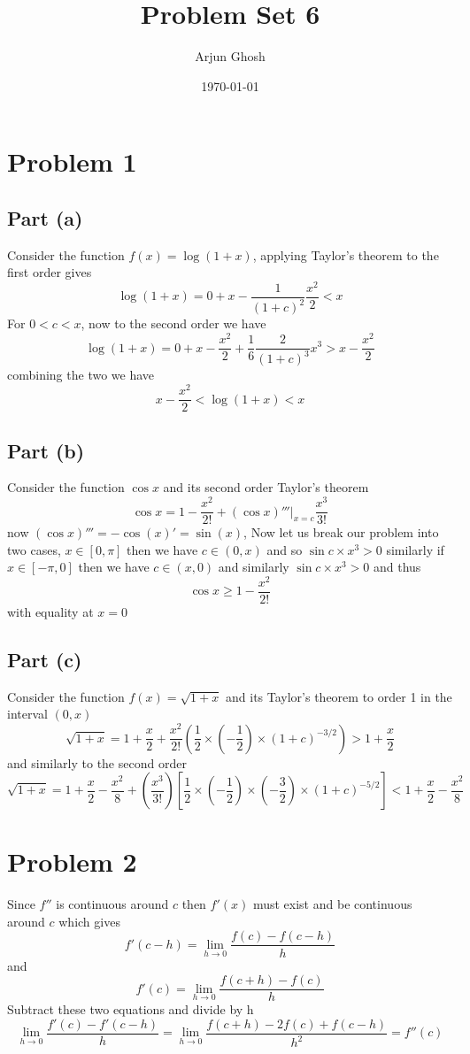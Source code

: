 \documentclass[12pt]{article}
\title{Problem Set 6}
\author{Arjun Ghosh}
\date{\today}
\begin{document}
\maketitle
\section*{Problem 1}
\subsection{Part (a)}
Consider the function $f(x)= \log(1+x)$, applying Taylor's theorem to the first order gives
$$
\log(1+x) = 0 + x   -\frac{1}{(1+c)^{2}} \frac{x^{2}}{2} <x
$$
For $0<c<x$, now to the second order we have
$$
\log(1 +x) = 0 + x - \frac{x^{2}}{2} + \frac{1}{6} \frac{2}{(1+c)^{3}} x^{3} > x -\frac{x^{2}}{2}
$$
combining the two we have
$$
x - \frac{x^{2}}{2} < \log(1+x)<x
$$
\subsection{Part (b)}
Consider the function $\cos x$ and its second order Taylor's theorem
$$
\cos x = 1-\frac{x^{2}}{2!} + (\cos x)'''|_{x=c}\frac{x^{3}}{3!}
$$
now $(\cos x)''' = -\cos(x)' = \sin(x)$, Now let us break our problem into two cases, $x \in[0,\pi]$ then we have $c \in(0,x)$ and so $\sin c \times x^{3}>0$ similarly if $x \in[-\pi,0]$ then we have $c \in(x,0)$ and similarly $\sin c \times x^{3}>0$ and thus 
$$
\cos x \geq 1-\frac{x^{2}}{2!}
$$
with equality at $x=0$

\subsection{Part (c)}
Consider the function $f(x) = \sqrt{ 1+x }$ and its Taylor's theorem to order 1 in the interval $(0,x)$ 
$$
\sqrt{ 1+x } = 1 + \frac{x}{2} + \frac{x^{2}}{2!} \left( \frac{1}{2}\times\left( -\frac{1}{2} \right)\times (1+c)^{-3/2} \right) > 1 + \frac{x}{2}
$$
and similarly to the second order
$$
\sqrt{ 1 + x } = 1 + \frac{x}{2} -\frac{x^{2}}{8} + \left( \frac{x^{3}}{3!} \right)\left[ \frac{1}{2}\times\left( -\frac{1}{2} \right)\times\left( -\frac{3}{2} \right)\times(1+c)^{-5/2} \right] < 1+\frac{x}{2}-\frac{x^{2}}{8}
$$

\section*{Problem 2}
Since $f''$ is continuous around $c$ then $f'(x)$ must exist and be continuous around $c$ which gives
$$
f'(c-h) = \lim_{ h \to 0 } \frac{f(c)-f(c-h)}{h}
$$
and
$$
f'(c) = \lim_{ h \to 0 } \frac{f(c+h)-f(c)}{h}
$$
Subtract these two equations and divide by h
$$
\lim_{ h \to 0 } \frac{f'(c) -f'(c-h)}{h} = \lim_{ h \to 0 }\frac{ f(c + h)-2f(c) + f(c-h)}{h^{2}} = f''(c)
$$
\end{document}
